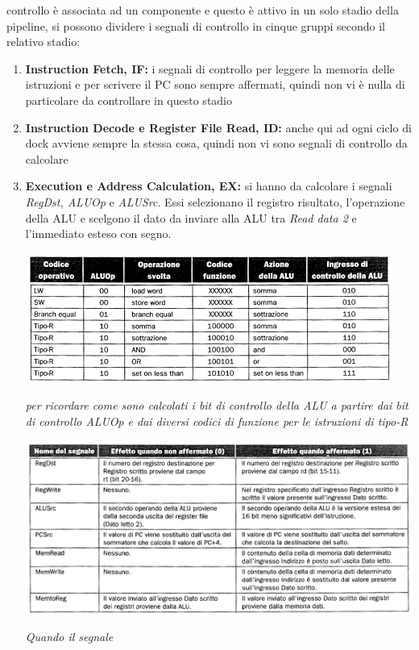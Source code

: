 \documentclass[a4paper,12pt, oneside]{book}
\begin{document}
controllo è associata ad un componente e questo è attivo in un solo
stadio della pipeline, si possono dividere i segnali di controllo
in cinque gruppi secondo il relativo stadio:
\begin{enumerate}
  \item \textbf{Instruction Fetch, IF:} i segnali di controllo per
  leggere la memoria delle istruzioni e per scrivere il PC sono sempre
  affermati, quindi non vi è nulla di particolare da controllare
  in questo stadio
  \item \textbf{Instruction Decode e Register File Read, ID:} anche qui ad
  ogni ciclo di dock avviene sempre la stessa cosa, quindi non
  vi sono segnali di controllo da calcolare
  \item \textbf{Execution e Address Calculation, EX:} si hanno da
  calcolare i segnali \textit{RegDst, ALUOp} e \textit{ALUSrc}. Essi
  selezionano il registro risultato, l'operazione della ALU e scelgono
  il dato da inviare alla ALU tra \textit{Read data 2} e l'immediato
  esteso con segno.
  \begin{center}
    \includegraphics[scale = 0.7]{img/pipec2.png}
  \end{center}
  \textit{per ricordare come sono calcolati i bit di controllo della
    ALU a partire dai bit di controllo ALUOp e dai diversi
    codici di funzione per le istruzioni di tipo-R}
  \begin{center}
    \includegraphics[scale = 0.7]{img/pipec3.png}
  \end{center}
  \textit{Quando il segnale
}
\end{enumerate}
\end{document}
